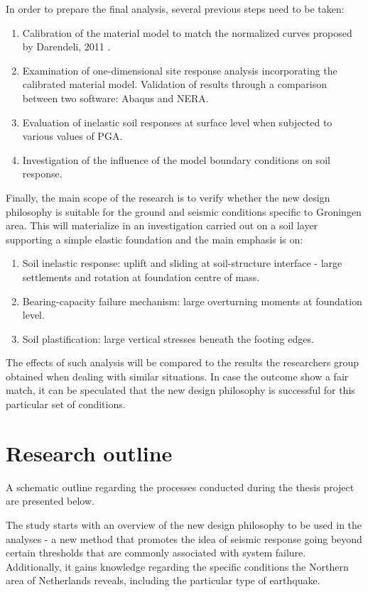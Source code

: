\documentclass[12pt,a4paper]{report}
\begin{document}
In order to prepare the final analysis, several previous steps need to be taken:
\begin{enumerate}
	\item Calibration of the material model to match the normalized curves proposed by Darendeli, 2011 \cite{darendeli2001development}.
	\item Examination of one-dimensional site response analysis incorporating the calibrated material model. Validation of results through a comparison between two software: Abaqus and NERA.
	\item Evaluation of inelastic soil responses at surface level when subjected to various values of PGA.
	\item Investigation of the influence of the model boundary conditions on soil response.
\end{enumerate}

Finally, the main scope of the research is to verify whether the new design philosophy is suitable for the ground and seismic conditions specific to Groningen area. This will materialize in an investigation carried out on a soil layer supporting a simple elastic foundation and the main emphasis is on:

\begin{enumerate}
	\item Soil inelastic response: uplift and sliding at soil-structure interface - large settlements and rotation at foundation centre of mass. 
	\item Bearing-capacity failure mechanism: large overturning moments at foundation level.
	\item Soil plastification: large vertical stresses beneath the footing edges.
\end{enumerate}

The effects of such analysis will be compared to the results the researchers group obtained when dealing with similar situations. In case the outcome show a fair match, it can be speculated that the new design philosophy is successful for this particular set of conditions.

\section{Research outline}
A schematic outline regarding the processes conducted during the thesis project are presented below. 

The study starts with an overview of the new design philosophy to be used in the analyses - a new method that promotes the idea of seismic response going beyond certain thresholds that are commonly associated with system failure. Additionally, it gains knowledge regarding the specific conditions the Northern area of Netherlands reveals, including the particular type of earthquake.
\end{document}
